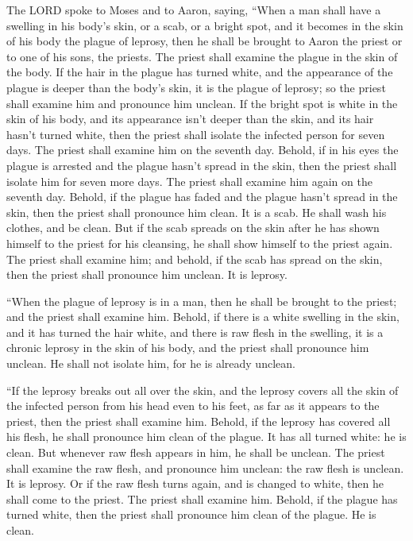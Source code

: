  The LORD spoke to Moses and to Aaron, saying,
 ``When a man shall have a swelling in his body's skin, or
a scab, or a bright spot, and it becomes in the skin of his body the
plague of leprosy, then he shall be brought to Aaron the priest or to
one of his sons, the priests.  The priest shall examine
the plague in the skin of the body. If the hair in the plague has turned
white, and the appearance of the plague is deeper than the body's skin,
it is the plague of leprosy; so the priest shall examine him and
pronounce him unclean.  If the bright spot is white in the
skin of his body, and its appearance isn't deeper than the skin, and its
hair hasn't turned white, then the priest shall isolate the infected
person for seven days.  The priest shall examine him on
the seventh day. Behold, if in his eyes the plague is arrested and the
plague hasn't spread in the skin, then the priest shall isolate him for
seven more days.  The priest shall examine him again on
the seventh day. Behold, if the plague has faded and the plague hasn't
spread in the skin, then the priest shall pronounce him clean. It is a
scab. He shall wash his clothes, and be clean.  But if the
scab spreads on the skin after he has shown himself to the priest for
his cleansing, he shall show himself to the priest again. 
The priest shall examine him; and behold, if the scab has spread on the
skin, then the priest shall pronounce him unclean. It is leprosy.

 ``When the plague of leprosy is in a man, then he shall
be brought to the priest;  and the priest shall examine
him. Behold, if there is a white swelling in the skin, and it has turned
the hair white, and there is raw flesh in the swelling, 
it is a chronic leprosy in the skin of his body, and the priest shall
pronounce him unclean. He shall not isolate him, for he is already
unclean.

 ``If the leprosy breaks out all over the skin, and the
leprosy covers all the skin of the infected person from his head even to
his feet, as far as it appears to the priest,  then the
priest shall examine him. Behold, if the leprosy has covered all his
flesh, he shall pronounce him clean of the plague. It has all turned
white: he is clean.  But whenever raw flesh appears in
him, he shall be unclean.  The priest shall examine the
raw flesh, and pronounce him unclean: the raw flesh is unclean. It is
leprosy.  Or if the raw flesh turns again, and is changed
to white, then he shall come to the priest.  The priest
shall examine him. Behold, if the plague has turned white, then the
priest shall pronounce him clean of the plague. He is clean.

